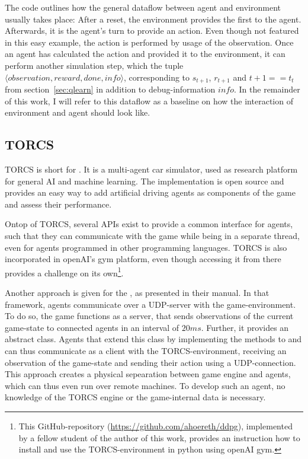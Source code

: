 The code outlines how the general dataflow between agent and environment usually takes place: After a reset, the environment provides the first  to the agent. Afterwards, it is the agent's turn to provide an action. Even though not featured in this easy example, the action is performed by usage of the observation. Once an agent has calculated the action and provided it to the environment, it can perform another simulation step, which the tuple $\langle observation, reward, done, info\rangle$, corresponding to $s_{t+1}$, $r_{t+1}$ and $t+1==t_t$ from section~\ref{sec:qlearn} in addition to debug-information $info$. In the remainder of this work, I will refer to this dataflow as a baseline on how the interaction of environment and agent should look like.

\subsection{TORCS}

TORCS is short for \cite{wymann_torcs_2013, wymann_torcs_2015}. It is a multi-agent car simulator, used as research platform for general AI and machine learning. The implementation is open source and provides an easy way to add artificial driving agents as components of the game and assess their performance. 

Ontop of TORCS, several APIs exist to provide a common interface for agents, such that they can communicate with the game while being in a separate thread, even for agents programmed in other programming languages. TORCS is also incorporated in openAI's gym platform, even though accessing it from there provides a challenge on its own\footnote{This GitHub-repository (\url{https://github.com/ahoereth/ddpg}), implemented by a fellow student of the author of this work, provides an instruction how to install and use the TORCS-environment in python using openAI gym.}. 

Another approach is given for the , as presented in their manual\cite{loiacono_simulated_2013}. In that framework, agents communicate over a UDP-server with the game-environment. To do so, the game functions as a server, that sends observations of the current game-state to connected agents in an interval of $20ms$. Further, it provides an abstract  class. Agents that extend this class by implementing the methods to  and  can thus communicate as a client with the TORCS-environment, receiving an observation of the game-state and sending their action using a UDP-connection. This approach creates a physical sepearation between game engine and agents, which can thus even run over remote machines. To develop such an agent, no knowledge of the TORCS engine or the game-internal data is necessary. 

